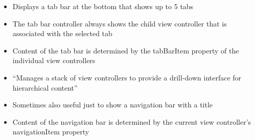 \begin{breakbox}

\begin{itemize}
\tightlist
\item
  Displays a tab bar at the bottom that shows up to 5 tabs
\item
  The tab bar controller always shows the child view controller that is
  associated with the selected tab
\item
  Content of the tab bar is determined by the tabBarItem property of the
  individual view controllers
\end{itemize}
\end{breakbox}
\begin{breakbox}

\begin{itemize}
\tightlist
\item
  ``Manages a stack of view controllers to provide a drill-down
  interface for hierarchical content''
\item
  Sometimes also useful just to show a navigation bar with a title
\item
  Content of the navigation bar is determined by the current view
  controller's navigationItem property
\end{itemize}

\end{breakbox}

